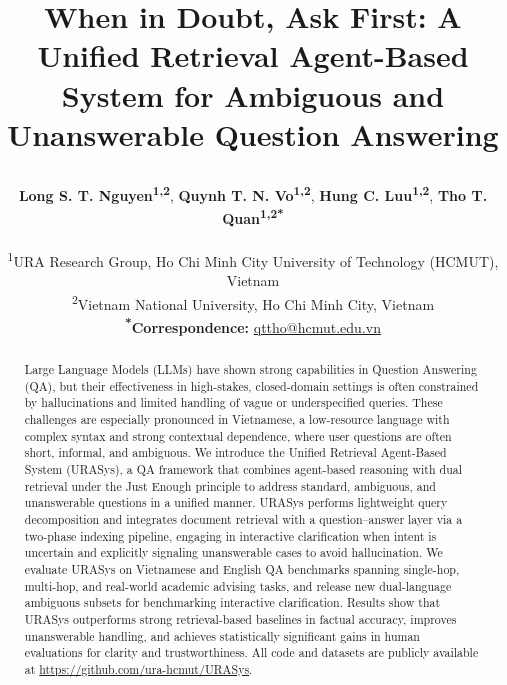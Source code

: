 \documentclass[11pt]{article}
\title{
When in Doubt, Ask First: A Unified Retrieval Agent-Based System for Ambiguous and Unanswerable Question Answering

}
\author{
 \textbf{Long S. T. Nguyen\textsuperscript{1,2}}, \textbf{Quynh T. N. Vo\textsuperscript{1,2}}, \textbf{Hung C. Luu\textsuperscript{1,2}},
 \textbf{Tho T. Quan\textsuperscript{1,2*}} \\ \\
 \textsuperscript{1}URA Research Group, Ho Chi Minh City University of Technology (HCMUT), Vietnam\\
  \textsuperscript{2}Vietnam National University, Ho Chi Minh City, Vietnam 
\\
 \small{
   \textbf{\textsuperscript{*}Correspondence:} \href{mailto:qttho@hcmut.edu.vn}{qttho@hcmut.edu.vn}
 }
}
\begin{document}
\maketitle
\begin{abstract}
Large Language Models (LLMs) have shown strong capabilities in Question Answering (QA), but their effectiveness in high-stakes, closed-domain settings is often constrained by hallucinations and limited handling of vague or underspecified queries. These challenges are especially pronounced in Vietnamese, a low-resource language with complex syntax and strong contextual dependence, where user questions are often short, informal, and ambiguous. We introduce the Unified Retrieval Agent-Based System (URASys), a QA framework that combines agent-based reasoning with dual retrieval under the Just Enough principle to address standard, ambiguous, and unanswerable questions in a unified manner. URASys performs lightweight query decomposition and integrates document retrieval with a question–answer layer via a two-phase indexing pipeline, engaging in interactive clarification when intent is uncertain and explicitly signaling unanswerable cases to avoid hallucination. We evaluate URASys on Vietnamese and English QA benchmarks spanning single-hop, multi-hop, and real-world academic advising tasks, and release new dual-language ambiguous subsets for benchmarking interactive clarification. Results show that URASys outperforms strong retrieval-based baselines in factual accuracy, improves unanswerable handling, and achieves statistically significant gains in human evaluations for clarity and trustworthiness. All code and datasets are publicly available at \url{https://github.com/ura-hcmut/URASys}.
\end{abstract}
\end{document}
